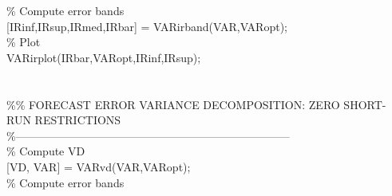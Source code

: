 \hspace{1mm}\hspace{5mm} \hspace{5mm} \textcolor{matlabgreen}{\% Compute error bands }\\ 
\hspace{1mm}\hspace{5mm} \hspace{5mm} [IRinf,IRsup,IRmed,IRbar] = VARirband(VAR,VARopt); \\ 
\hspace{1mm}\hspace{5mm} \hspace{5mm} \textcolor{matlabgreen}{\% Plot }\\ 
\hspace{1mm}\hspace{5mm} \hspace{5mm} VARirplot(IRbar,VARopt,IRinf,IRsup); \\ 
\hspace{1mm}\hspace{5mm} \hspace{5mm}  \\ 
\hspace{1mm}\hspace{5mm} \hspace{5mm}  \\ 
\hspace{1mm}\hspace{5mm} \hspace{5mm} \textcolor{matlabgreen}{\%}\textcolor{matlabgreen}{\% FORECAST ERROR VARIANCE DECOMPOSITION: ZERO SHORT-RUN RESTRICTIONS }\\ 
\hspace{1mm}\hspace{5mm} \hspace{5mm} \textcolor{matlabgreen}{\%--------------------------------------------------------------------------  }\\ 
\hspace{1mm}\hspace{5mm} \hspace{5mm} \textcolor{matlabgreen}{\% Compute VD }\\ 
\hspace{1mm}\hspace{5mm} \hspace{5mm} [VD, VAR] = VARvd(VAR,VARopt); \\ 
\hspace{1mm}\hspace{5mm} \hspace{5mm} \textcolor{matlabgreen}{\% Compute error bands }\\ 
